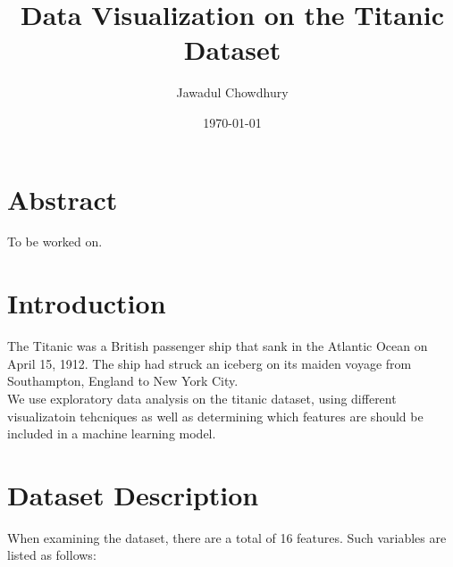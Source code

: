\documentclass[a4paper, twocolumn]{article}
\begin{document}
\title{Data Visualization on the Titanic Dataset}
\author{Jawadul Chowdhury}
\date{\today}
\maketitle

\section{Abstract}
To be worked on.

\section{Introduction}
The Titanic was a British passenger ship that sank in the Atlantic Ocean on April 15, 1912. The ship had struck an 
iceberg on its maiden voyage from Southampton, England to New York City. \\

We use exploratory data analysis on the titanic dataset, using different visualizatoin tehcniques as well as
determining which features are should be included in a machine learning model.

\section{Dataset Description}
When examining the dataset, there are a total of 16 features. Such 
variables are listed as follows:
\end{document}
